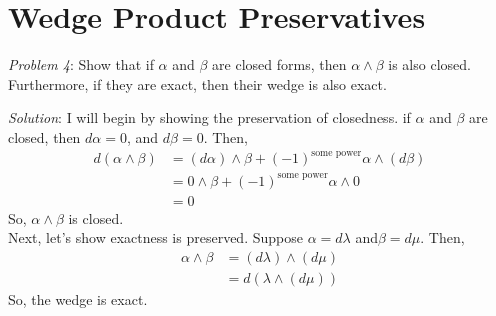 \section{Wedge Product Preservatives}

\emph{Problem 4}: Show that if $\alpha$ and $\beta$ are closed forms, then 
$\alpha\wedge\beta$ is also closed. Furthermore, if they are exact, then their
wedge is also exact.

\emph{Solution}: I will begin by showing the preservation of closedness. if
$\alpha$ and $\beta$ are closed, then $d\alpha=0$, and $d\beta=0$. Then,
\[
\begin{aligned}
d(\alpha\wedge\beta) &= (d\alpha)\wedge\beta +
                        (-1)^{\text{some power}}\alpha\wedge(d\beta)\\
                     &= 0\wedge\beta +
                        (-1)^{\text{some power}}\alpha\wedge0\\
                     &= 0
\end{aligned}
\]
So, $\alpha\wedge\beta$ is closed.
\\
Next, let's show exactness is preserved.
Suppose $\alpha=d\lambda$ and$\beta=d\mu$. Then,
\[
\begin{aligned}
\alpha\wedge\beta &= (d\lambda)\wedge(d\mu) \\
                  &= d(\lambda\wedge(d\mu))
\end{aligned}
\]
So, the wedge is exact.
